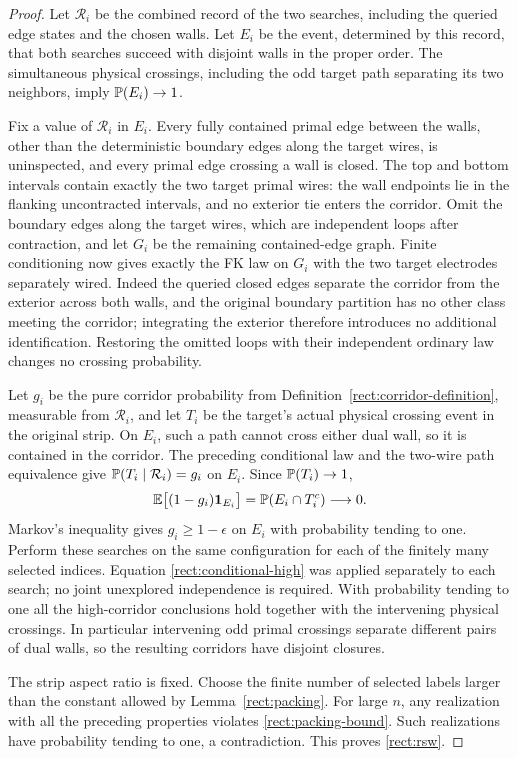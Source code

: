 \begin{proof}
Let $\mathcal R_i$ be the combined record of the two searches, including
the queried edge states and the chosen walls. Let $E_i$ be the event,
determined by this record, that both searches succeed with disjoint
walls in the proper order. The simultaneous physical crossings,
including the odd target path separating its two neighbors, imply
$\mathbb P(E_i)\to1$.

Fix a value of $\mathcal R_i$ in $E_i$. Every fully contained primal
edge between the walls, other than the deterministic boundary edges
along the target wires, is uninspected, and every primal edge crossing
a wall is closed. The top and bottom intervals contain exactly the
two target primal wires: the wall endpoints lie in the flanking
uncontracted intervals, and no exterior tie enters the corridor.
Omit the boundary edges along the target wires, which are independent
loops after contraction, and let $G_i$ be the remaining contained-edge
graph. Finite conditioning now gives exactly the FK law on $G_i$ with
the two target electrodes separately wired. Indeed the queried closed
edges separate the corridor from the exterior across both walls, and
the original boundary partition has
no other class meeting the corridor; integrating the exterior therefore
introduces no additional identification. Restoring the omitted loops
with their independent ordinary law changes no crossing probability.

Let $g_i$ be the pure corridor probability from
Definition~\ref{rect:corridor-definition}, measurable from
$\mathcal R_i$, and let $T_i$ be the target's actual physical crossing
event in the original strip. On $E_i$, such a path cannot cross either
dual wall, so it is contained in the corridor. The preceding conditional
law and the two-wire path equivalence give
$\mathbb P(T_i\mid\mathcal R_i)=g_i$ on $E_i$. Since $\mathbb P(T_i)\to1$,
\begin{equation}
 \mathbb E\bigl[(1-g_i)\mathbf 1_{E_i}\bigr]
   =\mathbb P(E_i\cap T_i^c)\longrightarrow0.
 \label{rect:conditional-high}
\end{equation}
Markov's inequality gives $g_i\ge1-\epsilon$ on $E_i$ with probability
tending to one.  Perform these searches on the same configuration for
each of the finitely many selected indices.  Equation
\eqref{rect:conditional-high} was applied separately to each search;
no joint unexplored independence is required.  With probability tending
to one all the high-corridor conclusions hold together with the
intervening physical crossings.  In particular intervening odd primal
crossings separate different pairs of dual walls, so the resulting
corridors have disjoint closures.

The strip aspect ratio is fixed.  Choose the finite number of selected
labels larger than the constant allowed by
Lemma~\ref{rect:packing}.  For large $n$, any realization with all the
preceding properties violates \eqref{rect:packing-bound}.  Such
realizations have probability tending to one, a contradiction.  This
proves \eqref{rect:rsw}.
\end{proof}


